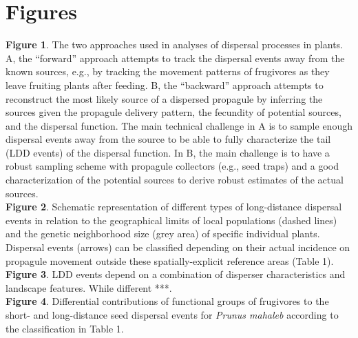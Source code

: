 \documentclass[a4paper, 12pt]{article}
\begin{document}

\newpage

\section*{Figures}
\begin{linenumbers}

\textbf{Figure 1}. The two approaches used in analyses of dispersal processes in plants. A, the “forward” approach attempts to track the dispersal events away from the known sources, e.g., by tracking the movement patterns of frugivores as they leave fruiting plants after feeding. B, the “backward” approach  attempts to reconstruct the most likely source of a dispersed propagule by inferring the sources given the propagule delivery pattern, the fecundity of potential sources, and the dispersal function. The main technical challenge in A is to sample enough dispersal events away from the source to be able to fully characterize the tail (LDD events) of the dispersal function. In B, the main challenge is to have a robust sampling scheme with propagule collectors (e.g., seed traps) and a good characterization of the potential sources to derive robust estimates of the actual sources.\\
 
\textbf{Figure 2}. Schematic representation of different types of long-distance dispersal events in relation to the geographical limits of local populations (dashed lines) and the genetic neighborhood size (grey area) of specific individual plants. Dispersal events (arrows) can be classified depending on their actual incidence on propagule movement outside these spatially-explicit reference areas (Table 1).\\
 
\textbf{Figure 3}. LDD events depend on a combination of disperser characteristics and landscape features. While different ***.\\
 
\textbf{Figure 4}. Differential contributions of functional groups of frugivores to the short- and long-distance seed dispersal events for \textit{Prunus mahaleb} according to the classification in Table 1.\\ 
\newpage


\end{linenumbers}
\end{document}
